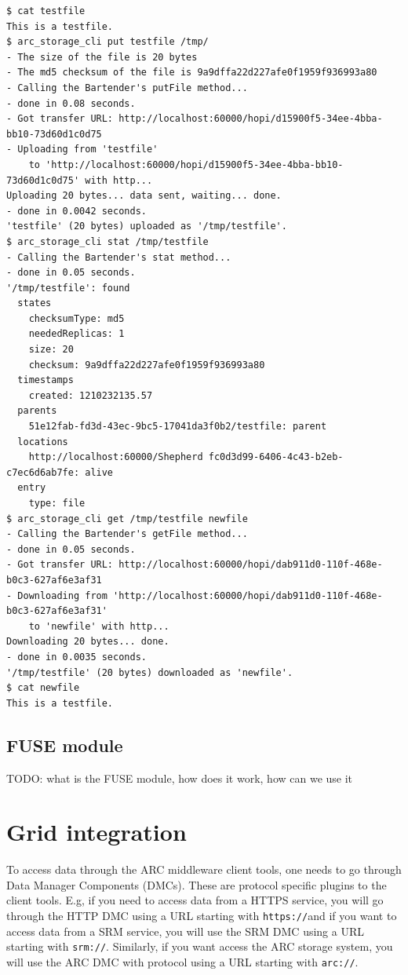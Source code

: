 \documentclass{book}
\begin{document}
\begin{verbatim}
$ cat testfile 
This is a testfile.
$ arc_storage_cli put testfile /tmp/
- The size of the file is 20 bytes
- The md5 checksum of the file is 9a9dffa22d227afe0f1959f936993a80
- Calling the Bartender's putFile method...
- done in 0.08 seconds.
- Got transfer URL: http://localhost:60000/hopi/d15900f5-34ee-4bba-bb10-73d60d1c0d75
- Uploading from 'testfile'
    to 'http://localhost:60000/hopi/d15900f5-34ee-4bba-bb10-73d60d1c0d75' with http...
Uploading 20 bytes... data sent, waiting... done.
- done in 0.0042 seconds.
'testfile' (20 bytes) uploaded as '/tmp/testfile'.
$ arc_storage_cli stat /tmp/testfile
- Calling the Bartender's stat method...
- done in 0.05 seconds.
'/tmp/testfile': found
  states
    checksumType: md5
    neededReplicas: 1
    size: 20
    checksum: 9a9dffa22d227afe0f1959f936993a80
  timestamps
    created: 1210232135.57
  parents
    51e12fab-fd3d-43ec-9bc5-17041da3f0b2/testfile: parent
  locations
    http://localhost:60000/Shepherd fc0d3d99-6406-4c43-b2eb-c7ec6d6ab7fe: alive
  entry
    type: file
$ arc_storage_cli get /tmp/testfile newfile
- Calling the Bartender's getFile method...
- done in 0.05 seconds.
- Got transfer URL: http://localhost:60000/hopi/dab911d0-110f-468e-b0c3-627af6e3af31
- Downloading from 'http://localhost:60000/hopi/dab911d0-110f-468e-b0c3-627af6e3af31'
    to 'newfile' with http...
Downloading 20 bytes... done.
- done in 0.0035 seconds.
'/tmp/testfile' (20 bytes) downloaded as 'newfile'.
$ cat newfile 
This is a testfile.
\end{verbatim}


\subsection{FUSE module} %
\label{sub:fuse_module}

TODO: what is the FUSE module, how does it work, how can we use it



\section{Grid integration} %
\label{sec:grid_integration}

To access data through the ARC middleware client tools, one needs to go through Data Manager Components (DMCs). These are protocol specific plugins to the client tools. E.g, if you need to access data from a HTTPS service, you will go through the HTTP DMC using a URL starting with \verb!https://!and if you want to access data from a SRM service, you will use the SRM DMC using a URL starting with \verb!srm://!. Similarly, if you want access the ARC storage system, you will use the ARC DMC with protocol using a URL starting with \verb!arc://!. 
\end{document}
